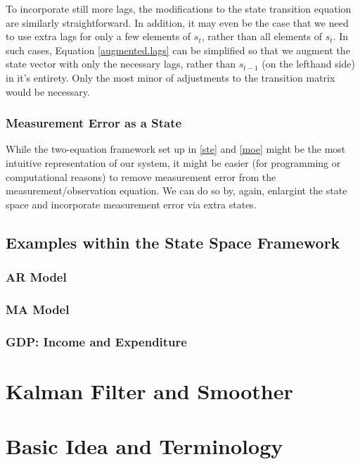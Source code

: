 \documentclass[a4paper,12pt]{article}
\begin{document}
To incorporate still more lags, the modifications to the state transition equation are similarly straightforward. In addition, it may even be the case that we need to use extra lags for only a few elements of $s_t$, rather than all elements of $s_t$. In such cases, Equation \ref{augmented.lags} can be simplified so that we augment the state vector with only the necessary lags, rather than $s_{t-1}$ (on the lefthand side) in it's entirety. Only the most minor of adjustments to the transition matrix would be necessary.


\subsubsection{Measurement Error as a State}

While the two-equation framework set up in \ref{ste} and \ref{moe} might be the most intuitive representation of our system, it might be easier (for programming or computational reasons) to remove measurement error from the measurement/observation equation. We can do so by, again, enlargint the state space and incorporate measurement error via extra states.

\subsection{Examples within the State Space Framework}

\subsubsection{AR Model}
\subsubsection{MA Model}
\subsubsection{GDP: Income and Expenditure}


\newpage
\section{Kalman Filter and Smoother}

\section{Basic Idea and Terminology}
\end{document}
